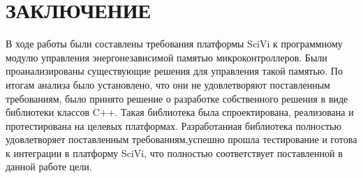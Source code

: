 \chapter*{ЗАКЛЮЧЕНИЕ}

В ходе работы были составлены требования платформы SciVi к программному модулю управления энергонезависимой памятью микроконтроллеров.
Были проанализированы существующие решения для управления такой памятью.
По итогам анализа было установлено, что они не удовлетворяют поставленным требованиям, было принято решение о разработке собственного решения в виде библиотеки классов C++.
Такая библиотека была спроектирована, реализована и протестирована на целевых платформах.
Разработанная библиотека полностью удовлетворяет поставленным требованиям,успешно прошла тестирование и готова к интеграции в платформу SciVi, что полностью соответствует поставленной в данной работе цели.

